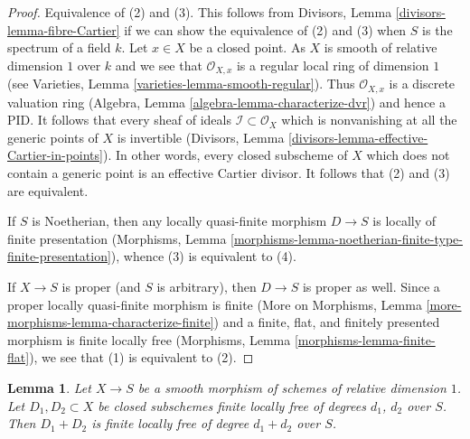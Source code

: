 \documentclass{stacks-project}
\theoremstyle{plain}
\newtheorem{lemma}[subsection]{Lemma}
\theoremstyle{definition}
\theoremstyle{remark}
\numberwithin{equation}{subsection}
\begin{document}
\begin{proof}
Equivalence of (2) and (3). This follows from
Divisors, Lemma \ref{divisors-lemma-fibre-Cartier}
if we can show the equivalence of (2) and (3) when
$S$ is the spectrum of a field $k$. Let $x \in X$ be a closed point.
As $X$ is smooth of relative dimension $1$ over $k$ and we see that
$\mathcal{O}_{X, x}$ is a regular local ring of dimension $1$
(see Varieties, Lemma \ref{varieties-lemma-smooth-regular}).
Thus $\mathcal{O}_{X, x}$ is a discrete valuation ring
(Algebra, Lemma \ref{algebra-lemma-characterize-dvr})
and hence a PID. It follows that every sheaf of ideals
$\mathcal{I} \subset \mathcal{O}_X$ which is nonvanishing at all
the generic points of $X$ is invertible
(Divisors, Lemma \ref{divisors-lemma-effective-Cartier-in-points}).
In other words, every closed subscheme of $X$ which does not contain
a generic point is an effective Cartier divisor.
It follows that (2) and (3) are equivalent.

\medskip\noindent
If $S$ is Noetherian, then any locally quasi-finite morphism
$D \to S$ is locally of finite presentation (Morphisms, Lemma
\ref{morphisms-lemma-noetherian-finite-type-finite-presentation}),
whence (3) is equivalent to (4).

\medskip\noindent
If $X \to S$ is proper (and $S$ is arbitrary), then $D \to S$ is
proper as well. Since a proper locally quasi-finite morphism is finite
(More on Morphisms, Lemma \ref{more-morphisms-lemma-characterize-finite})
and a finite, flat, and finitely presented morphism is finite locally free
(Morphisms, Lemma \ref{morphisms-lemma-finite-flat}), we see that
(1) is equivalent to (2).
\end{proof}

\begin{lemma}
\label{lemma-sum-divisors-on-curves}
Let $X \to S$ be a smooth morphism of schemes of relative dimension $1$.
Let $D_1, D_2 \subset X$ be closed subschemes finite locally free of
degrees $d_1$, $d_2$ over $S$. Then $D_1 + D_2$ is finite locally free
of degree $d_1 + d_2$ over $S$.
\end{lemma}
\end{document}

